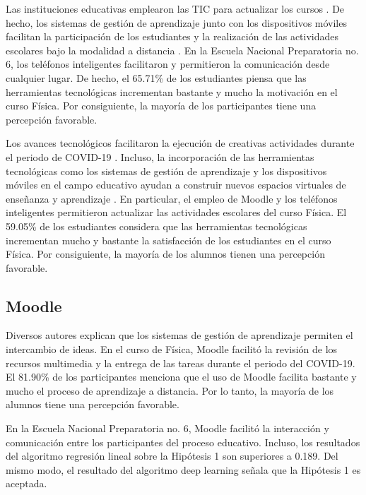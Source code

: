\documentclass[spanish]{textolivre}
\begin{document}
Las instituciones educativas emplearon las TIC para actualizar los cursos \cite{cabero-almenara_covid-19:_2020, phamdo_learning_2022}. De hecho, los sistemas de gestión de aprendizaje junto con los dispositivos móviles facilitan la participación de los estudiantes y la realización de las actividades escolares bajo la modalidad a distancia \cite{farsi_investigating_2022}. En la Escuela Nacional Preparatoria no. 6, los teléfonos inteligentes facilitaron y permitieron la comunicación desde cualquier lugar. De hecho, el 65.71\% de los estudiantes piensa que las herramientas tecnológicas incrementan bastante y mucho la motivación en el curso Física. Por consiguiente, la mayoría de los participantes tiene una percepción favorable.

Los avances tecnológicos facilitaron la ejecución de creativas actividades durante el periodo de COVID-19 \cite{area-moreira_blended_2020, farsi_investigating_2022, munoz_arteaga_retos_2022}. Incluso, la incorporación de las herramientas tecnológicas como los sistemas de gestión de aprendizaje y los dispositivos móviles en el campo educativo ayudan a construir nuevos espacios virtuales de enseñanza y aprendizaje \cite{farsi_investigating_2022}. En particular, el empleo de Moodle y los teléfonos inteligentes permitieron actualizar las actividades escolares del curso Física. El 59.05\% de los estudiantes considera que las herramientas tecnológicas incrementan mucho y bastante la satisfacción de los estudiantes en el curso Física. Por consiguiente, la mayoría de los alumnos tienen una percepción favorable.

\subsection{Moodle}

Diversos autores \cite{garcia_integration_2021, phamdo_learning_2022} explican que los sistemas de gestión de aprendizaje permiten el intercambio de ideas. En el curso de Física, Moodle facilitó la revisión de los recursos multimedia y la entrega de las tareas durante el periodo del COVID-19. El 81.90\% de los participantes menciona que el uso de Moodle facilita bastante y mucho el proceso de aprendizaje a distancia. Por lo tanto, la mayoría de los alumnos tiene una percepción favorable.

En la Escuela Nacional Preparatoria no. 6, Moodle facilitó la interacción y comunicación entre los participantes del proceso educativo. Incluso, los resultados del algoritmo regresión lineal sobre la Hipótesis 1 son superiores a 0.189. Del mismo modo, el resultado del algoritmo deep learning señala que la Hipótesis 1 es aceptada.
\end{document}
